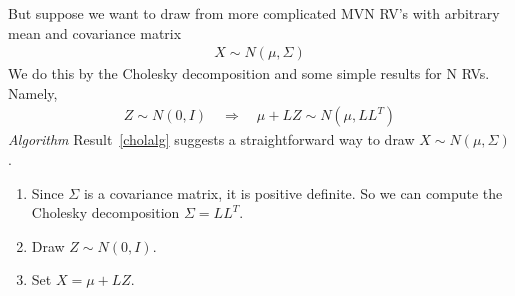 \documentclass[12pt]{article}
\theoremstyle{plain}
\theoremstyle{definition}
\theoremstyle{remark}
\begin{document}
But suppose we want to draw from more complicated MVN RV's with
arbitrary mean and covariance matrix
\begin{align*}
  X \sim N(\mu, \Sigma)
\end{align*}
We do this by the Cholesky decomposition and some simple results for N
RVs. Namely,
\begin{align}
  Z \sim N(0,I) \quad \Rightarrow \quad
  \mu+LZ \sim N(\mu, LL^T)
  \label{cholalg}
\end{align}
{\sl Algorithm}\: Result~\ref{cholalg} suggests a straightforward way
to draw $X\sim N(\mu,\Sigma)$.
\begin{enumerate}
  \item Since $\Sigma$ is a covariance matrix, it is positive definite.
    So we can compute the Cholesky decomposition $\Sigma=LL^T$.
  \item Draw $Z\sim N(0,I)$.
  \item Set $X=\mu+LZ$.
\end{enumerate}



\end{document}
